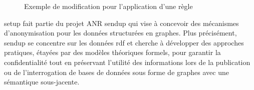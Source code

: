 \begin{figure}[htb]
    \centering
    \vspace{-5em}
    \caption{Exemple de modification pour l'application d'une règle}
    \label{fig:app_rule}
\end{figure}


\gls{setup} fait partie du projet ANR \gls{sendup} \cite{ReSEauxNumeriquesDonnees,SENDUPSEmanticNetwork} qui vise à concevoir des mécanismes d'anonymisation pour les données structurées en graphes.
Plus précisément, \gls{sendup} se concentre sur les données \gls{rdf} et cherche à développer des approches pratiques, étayées par des modèles théoriques formels, pour garantir la confidentialité tout en préservant l'utilité des informations lors de la publication ou de l'interrogation de bases de données sous forme de graphes avec une sémantique sous-jacente.

\FloatBarrier
